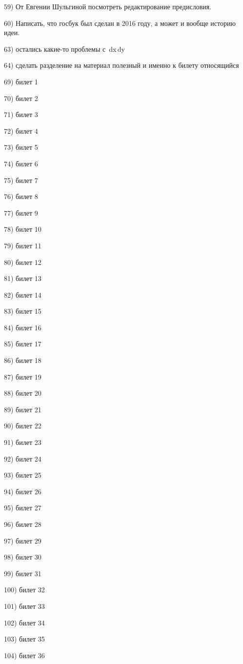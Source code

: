 59) От Евгении Шульгиной посмотреть редактирование предисловия.

60) Написать, что госбук был сделан в 2016 году, а может и вообще историю идеи. 

63) остались какие-то проблемы с \,dx\,dy

64) сделать разделение на материал полезный и именно к билету относящийся

69) билет 1

70) билет 2

71) билет 3

72) билет 4

73) билет 5

74) билет 6

75) билет 7

76) билет 8

77) билет 9

78) билет 10

79) билет 11

80) билет 12

81) билет 13

82) билет 14

83) билет 15

84) билет 16

85) билет 17

86) билет 18

87) билет 19

88) билет 20

89) билет 21

90) билет 22

91) билет 23

92) билет 24

93) билет 25

94) билет 26

95) билет 27

96) билет 28

97) билет 29

98) билет 30

99) билет 31

100) билет 32

101) билет 33

102) билет 34

103) билет 35

104) билет 36
